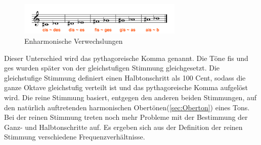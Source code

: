 \begin{figure}[H]
    \centering
    \includegraphics[width=0.7\textwidth]{Bilder/enharmonische-verwechslung.png}
    \caption{Enharmonische Verwechslungen}
\end{figure}
Dieser Unterschied wird das pythagoreische Komma genannt. Die Töne fis und ges wurden später von der gleichstufigen Stimmung gleichgesetzt. Die gleichstufige Stimmung definiert einen Halbtonschritt als 100 Cent, sodass die ganze Oktave gleichstufig verteilt ist und das
pythagoreische Komma aufgelöst wird. Die reine Stimmung basiert, entgegen den anderen beiden Stimmungen, auf den natürlich auftretenden harmonischen Obertönen(\ref{sec:Oberton}) eines Tons. Bei der reinen Stimmung treten noch mehr Probleme mit der Bestimmung der Ganz- und Halbtonschritte auf. Es ergeben sich aus der Definition der reinen Stimmung verschiedene Frequenzverhältnisse. \cite{abcmusik}

